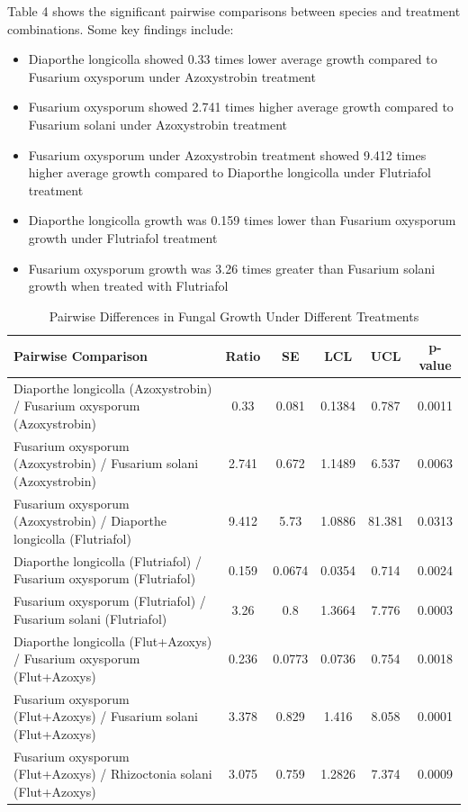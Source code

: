 \documentclass[
  10pt,
  letterpaper,
  twocolumn]{article}
\providecommand{\tightlist}{%
  \setlength{\itemsep}{0pt}\setlength{\parskip}{0pt}}\usepackage{longtable,booktabs,array}
\begin{document}
Table 4 shows the significant pairwise comparisons between species and
treatment combinations. Some key findings include:

\begin{itemize}
\tightlist
\item
  Diaporthe longicolla showed 0.33 times lower average growth compared
  to Fusarium oxysporum under Azoxystrobin treatment
\item
  Fusarium oxysporum showed 2.741 times higher average growth compared
  to Fusarium solani under Azoxystrobin treatment
\item
  Fusarium oxysporum under Azoxystrobin treatment showed 9.412 times
  higher average growth compared to Diaporthe longicolla under
  Flutriafol treatment
\item
  Diaporthe longicolla growth was 0.159 times lower than Fusarium
  oxysporum growth under Flutriafol treatment
\item
  Fusarium oxysporum growth was 3.26 times greater than Fusarium solani
  growth when treated with Flutriafol
\end{itemize}

\vspace{0.1cm}

\begin{table}[ht]
\centering
\caption{Pairwise Differences in Fungal Growth Under Different Treatments}
\renewcommand{\arraystretch}{1.2}
\begin{tabular}{|p{8cm}|c|c|c|c|c|}
\hline
\rowcolor{gray!15} \textbf{Pairwise Comparison} & \textbf{Ratio} & \textbf{SE} & \textbf{LCL} & \textbf{UCL} & \textbf{p-value} \\
\hline
Diaporthe longicolla (Azoxystrobin) / Fusarium oxysporum (Azoxystrobin) & 0.33 & 0.081 & 0.1384 & 0.787 & 0.0011 \\
Fusarium oxysporum (Azoxystrobin) / Fusarium solani (Azoxystrobin) & 2.741 & 0.672 & 1.1489 & 6.537 & 0.0063 \\
Fusarium oxysporum (Azoxystrobin) / Diaporthe longicolla (Flutriafol) & 9.412 & 5.73 & 1.0886 & 81.381 & 0.0313 \\
Diaporthe longicolla (Flutriafol) / Fusarium oxysporum (Flutriafol) & 0.159 & 0.0674 & 0.0354 & 0.714 & 0.0024 \\
Fusarium oxysporum (Flutriafol) / Fusarium solani (Flutriafol) & 3.26 & 0.8 & 1.3664 & 7.776 & 0.0003 \\
Diaporthe longicolla (Flut+Azoxys) / Fusarium oxysporum (Flut+Azoxys) & 0.236 & 0.0773 & 0.0736 & 0.754 & 0.0018 \\
Fusarium oxysporum (Flut+Azoxys) / Fusarium solani (Flut+Azoxys) & 3.378 & 0.829 & 1.416 & 8.058 & 0.0001 \\
Fusarium oxysporum (Flut+Azoxys) / Rhizoctonia solani (Flut+Azoxys) & 3.075 & 0.759 & 1.2826 & 7.374 & 0.0009 \\
\hline
\end{tabular}
\end{table}
\end{document}
